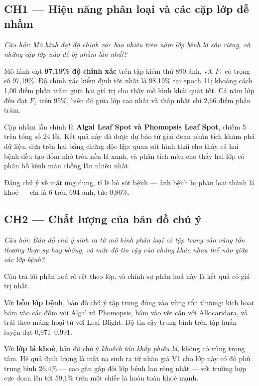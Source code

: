 \subsection{CH1 --- Hiệu năng phân loại và các cặp lớp dễ nhầm}

\emph{Câu hỏi: Mô hình \EffNet{} đạt độ chính xác bao nhiêu trên năm lớp bệnh lá
sầu riêng, và những cặp lớp nào dễ bị nhầm lẫn nhất?}

Mô hình đạt \textbf{97,19\% độ chính xác} trên tập kiểm thử 890 ảnh, với $F_1$ có
trọng số 97,19\%. Độ chính xác kiểm định tốt nhất là 98,19\% tại epoch 11; khoảng
cách 1,00 điểm phần trăm giữa hai giá trị cho thấy mô hình khái quát tốt. Cả năm
lớp đều đạt $F_1$ trên 95\%, biên độ giữa lớp cao nhất và thấp nhất chỉ 2,66 điểm
phần trăm.

Cặp nhầm lẫn chính là \textbf{Algal Leaf Spot và Phomopsis Leaf Spot}, chiếm 5
trên tổng số 24 lỗi. Kết quả này đã được dự báo từ giai đoạn phân tích khám phá dữ
liệu, dựa trên hai bằng chứng độc lập: quan sát hình thái cho thấy cả hai bệnh đều
tạo đốm nhỏ trên nền lá xanh, và phân tích màu cho thấy hai lớp có phân bố kênh
màu chồng lấn nhiều nhất.

Đáng chú ý về mặt ứng dụng, tỉ lệ bỏ sót bệnh --- ảnh bệnh bị phân loại thành lá
khoẻ --- chỉ là 6 trên 694 ảnh, tức 0,86\%.

\subsection{CH2 --- Chất lượng của bản đồ chú ý}

\emph{Câu hỏi: Bản đồ chú ý sinh ra từ mô hình phân loại có tập trung vào vùng tổn
thương thực sự hay không, và mức độ tin cậy của chúng khác nhau thế nào giữa các
lớp bệnh?}

Câu trả lời phân hoá rõ rệt theo lớp, và chính sự phân hoá này là kết quả có giá
trị nhất.

Với \textbf{bốn lớp bệnh}, bản đồ chú ý tập trung đúng vào vùng tổn thương: kích
hoạt bám vào các đốm với Algal và Phomopsis, bám vào vết cắn với Allocaridara, và
trải theo mảng hoại tử với Leaf Blight. Độ tin cậy trung bình trên tập huấn luyện
đạt 0,971--0,991.

Với \textbf{lớp lá khoẻ}, bản đồ chú ý \emph{khuếch tán khắp phiến lá}, không có
vùng trọng tâm. Hệ quả định lượng là mặt nạ sinh ra từ nhãn giả V1 cho lớp này có
độ phủ trung bình 26,4\% --- cao gần gấp đôi lớp bệnh lan rộng nhất --- với trường
hợp cực đoan lên tới 59,1\% trên một chiếc lá hoàn toàn khoẻ mạnh.

